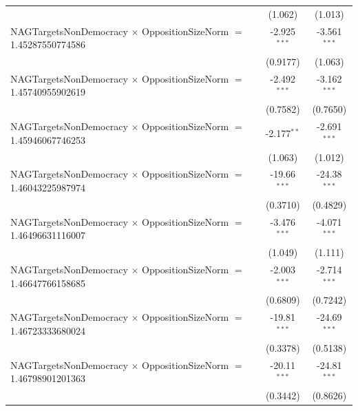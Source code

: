 \begin{tabular}{lcc}
                                                                                & (1.062)              & (1.013)\\   
   NAGTargetsNonDemocracy $\times$ OppositionSizeNorm $=$ 1.45287550774586      & -2.925$^{***}$       & -3.561$^{***}$\\   
                                                                                & (0.9177)             & (1.063)\\   
   NAGTargetsNonDemocracy $\times$ OppositionSizeNorm $=$ 1.45740955902619      & -2.492$^{***}$       & -3.162$^{***}$\\   
                                                                                & (0.7582)             & (0.7650)\\   
   NAGTargetsNonDemocracy $\times$ OppositionSizeNorm $=$ 1.45946067746253      & -2.177$^{**}$        & -2.691$^{***}$\\   
                                                                                & (1.063)              & (1.012)\\   
   NAGTargetsNonDemocracy $\times$ OppositionSizeNorm $=$ 1.46043225987974      & -19.66$^{***}$       & -24.38$^{***}$\\   
                                                                                & (0.3710)             & (0.4829)\\   
   NAGTargetsNonDemocracy $\times$ OppositionSizeNorm $=$ 1.46496631116007      & -3.476$^{***}$       & -4.071$^{***}$\\   
                                                                                & (1.049)              & (1.111)\\   
   NAGTargetsNonDemocracy $\times$ OppositionSizeNorm $=$ 1.46647766158685      & -2.003$^{***}$       & -2.714$^{***}$\\   
                                                                                & (0.6809)             & (0.7242)\\   
   NAGTargetsNonDemocracy $\times$ OppositionSizeNorm $=$ 1.46723333680024      & -19.81$^{***}$       & -24.69$^{***}$\\   
                                                                                & (0.3378)             & (0.5138)\\   
   NAGTargetsNonDemocracy $\times$ OppositionSizeNorm $=$ 1.46798901201363      & -20.11$^{***}$       & -24.81$^{***}$\\   
                                                                                & (0.3442)             & (0.8626)\\   

\end{tabular}
